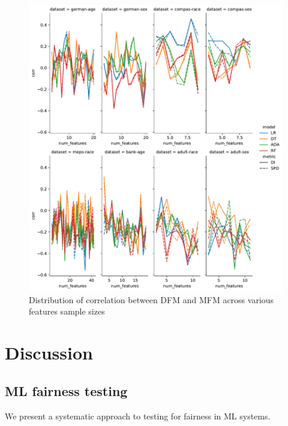 \documentclass{article}
\begin{document}
\begin{figure}
  \centering
  \includegraphics[width=0.95\linewidth]{lineplot--num-features--corr.pdf}
  \caption{Distribution of correlation between DFM and MFM across
    various features sample sizes}
  \label{fig:lineplot--num-features--corr}
\end{figure}

\section{Discussion}\label{sec:discuss}

\subsection{ML fairness testing}\label{sec:discuss-ml-fair-test}

We present a systematic approach to testing for fairness in ML
systems.

\end{document}
